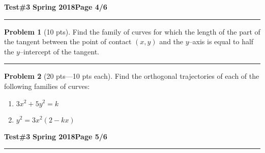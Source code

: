 \documentclass[12pt]{article}
\theoremstyle{definition}
\newtheorem{problem}{Problem}
\begin{document}
\newpage

\hfill{\large\bf Test\#3}\hfill{\large\bf
  Spring 2018}\hfill{\large\bf Page 4/6}\hrule

\bigskip
\begin{problem}[10 pts]
Find the family of curves for which the length of the part of the tangent between the point of contact $(x,y)$ and the $y$--axis is equal to half the $y$--intercept of the tangent.
\vspace{4cm}
\begin{flushright}
\end{flushright}
\end{problem}
\hrule

\begin{problem}[20 pts---10 pts each]
Find the orthogonal trajectories of each of the following families of curves:
\begin{enumerate}
  \item $3x^2+5y^2 = k$
  \vspace{4cm}
  \begin{flushright}
  \end{flushright}
  \item $y^2 = 3x^2(2-kx)$
  \vspace{4cm}
  \begin{flushright}
  \end{flushright}
\end{enumerate}
\end{problem}

\newpage

\hfill{\large\bf Test\#3}\hfill{\large\bf
  Spring 2018}\hfill{\large\bf Page 5/6}\hrule
\end{document}
